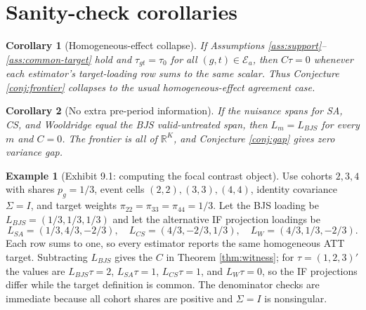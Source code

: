 \documentclass[11pt]{article}
\newcommand{\R}{\mathbb{R}}
\theoremstyle{definition}
\newtheorem{example}{Example}
\theoremstyle{plain}
\newtheorem{corollary}{Corollary}
\theoremstyle{remark}
\begin{document}
\section{Sanity-check corollaries}
\begin{corollary}[Homogeneous-effect collapse]\label{cor:homogeneous}
If Assumptions \ref{ass:support}--\ref{ass:common-target} hold and $\tau_{gt}=\tau_0$ for all $(g,t)\in\mathcal{E}_a$, then $C\tau=0$ whenever each estimator's target-loading row sums to the same scalar. Thus Conjecture \ref{conj:frontier} collapses to the usual homogeneous-effect agreement case.
\end{corollary}

\begin{corollary}[No extra pre-period information]\label{cor:no-extra-pre}
If the nuisance spans for SA, CS, and Wooldridge equal the BJS valid-untreated span, then $L_m=L_{BJS}$ for every $m$ and $C=0$. The frontier is all of $\R^K$, and Conjecture \ref{conj:gap} gives zero variance gap.
\end{corollary}

\begin{example}[Exhibit 9.1: computing the focal contrast object]\label{ex:contrast}
Use cohorts $2,3,4$ with shares $p_g=1/3$, event cells $(2,2),(3,3),(4,4)$, identity covariance $\Sigma=I$, and target weights $\pi_{22}=\pi_{33}=\pi_{44}=1/3$. Let the BJS loading be $L_{BJS}=(1/3,1/3,1/3)$ and let the alternative IF projection loadings be
\[
L_{SA}=(1/3,4/3,-2/3),\quad
L_{CS}=(4/3,-2/3,1/3),\quad
L_W=(4/3,1/3,-2/3).
\]
Each row sums to one, so every estimator reports the same homogeneous ATT target. Subtracting $L_{BJS}$ gives the $C$ in Theorem \ref{thm:witness}; for $\tau=(1,2,3)'$ the values are $L_{BJS}\tau=2$, $L_{SA}\tau=1$, $L_{CS}\tau=1$, and $L_W\tau=0$, so the IF projections differ while the target definition is common. The denominator checks are immediate because all cohort shares are positive and $\Sigma=I$ is nonsingular.
\end{example}
\end{document}
